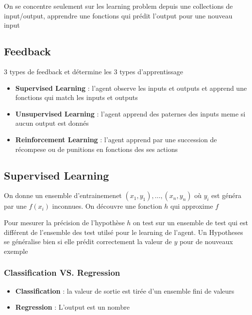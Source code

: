 \documentclass[12pt]{article}
\begin{document}
	On se concentre seulement sur les learning problem depuis une collections de input/output, apprendre une fonctions qui prédit l'output pour une nouveau input
	
	\subsection{Feedback}
		3 types de feedback et détermine les 3 types d'apprentissage
		\begin{itemize}
			\item \textbf{Supervised Learning} : l'agent observe les inputs et outputs et apprend une fonctions qui match les inputs et outputs
			\item \textbf{Unsupervised Learning} : l'agent apprend des paternes des inputs meme si aucun output est donnés
			\item \textbf{Reinforcement Learning} : l'agent apprend par une succession de récompese ou de punitions en fonctions des ses actions
			
		\end{itemize}
		
	\subsection{Supervised Learning}
		On donne un ensemble d'entrainemenet $(x_1,y_1), \dots , (x_n, y_n)$
			 où $y_i$ est généra par une $f(x_i)$ inconnues. On découvre une fonction $h$ qui approxime $f$
			
			Pour mesurer la précision de l'hypothèse $h$ on test sur un ensemble de test qui est différent de l'ensemble des test utilsé pour le learning de l'agent.
			Un Hypotheses se généralise bien si elle prédit correctement la valeur de $y$ pour de nouveaux exemple
		\subsubsection{Classification VS. Regression}
			\begin{itemize}
				\item \textbf{Classification} : la valeur de sortie est tirée d'un ensemble fini de valeurs
				\item \textbf{Regression} : L'output est un nombre
			
			\end{itemize}
			
\end{document}

